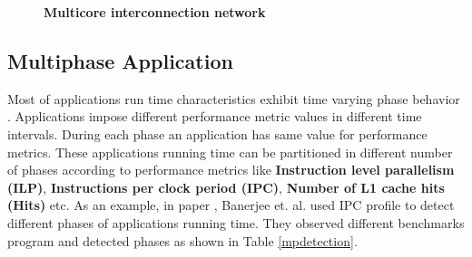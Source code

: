 \documentclass[10pt, conference]{IEEEtran}
\begin{document}
\begin{figure}[tb]
\begin{center}
{}%
\hspace{0.2cm}
%

\end{center}
\vspace{-0.4cm}
\caption{\textbf{Multicore interconnection network}}
\label{Interconn}
\vspace{-0.3cm}
\end{figure}


\subsection{Multiphase Application}    
Most of applications run time characteristics exhibit time varying phase behavior \cite{Cho06,Sherwood03}. 
Applications impose different performance metric values in different  time intervals. During each phase an application has same value for performance metrics. These applications running time can be partitioned in different number of  phases according to performance metrics like  {\bf Instruction level parallelism (ILP)}, {\bf Instructions per clock period (IPC)}, {\bf Number of L1 cache hits (Hits)} etc. As an example, in paper \cite{Benerjee08}, Banerjee et. al. used IPC profile to detect different phases of applications running time. They observed different benchmarks program and detected phases as shown in Table \ref{mpdetection}. 
\end{document}
